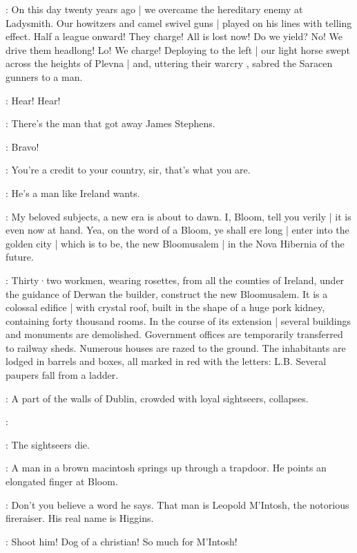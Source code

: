 \Bloom:
On this day twenty years ago |
we overcame the hereditary enemy at Ladysmith.
Our howitzers and camel swivel guns |
played on his lines with telling effect.
Half a league onward!
They charge!
All is lost now!
Do we yield?
No!
We drive them headlong!
Lo!
We charge!
Deploying to the left |
our light horse swept across the heights of Plevna |
and,
uttering their warcry ,
sabred the Saracen gunners to a man.

\Typesetters[1]:
Hear!
Hear!

\JohnWyse[2]:
There's the man that got away James Stephens.

\Bluecoat[1]:
Bravo!

\OldResident[2]:
You're a credit to your country,
sir,
that's what you are.

\AppleWoman[1]:
He's a man like Ireland wants.

\Bloom:
My beloved subjects,
a new era is about to dawn.
I,
Bloom,
tell you verily |
it is even now at hand.
Yea,
on the word of a Bloom,
ye shall ere long |
enter into the golden city |
which is to be,
the new Bloomusalem |
in the Nova Hibernia of the future.

:
Thirty·two workmen,
wearing rosettes,
from all the counties of Ireland,
under the guidance of Derwan the builder,
construct the new Bloomusalem.
It is a colossal edifice |
with crystal roof,
built in the shape of a huge pork kidney,
containing forty thousand rooms.
In the course of its extension |
several buildings and monuments are demolished.
Government offices are temporarily transferred to railway sheds.
Numerous houses are razed to the ground.
The inhabitants are lodged in barrels and boxes,
all marked in red with the letters:
L.B.
Several paupers fall from a ladder.

:
A part of the walls of Dublin,
crowded with loyal sightseers,
collapses.

\Sightseers:

\sout{}

:
The sightseers die.

:
A man in a brown macintosh springs up through a trapdoor.
He points an elongated finger at Bloom.

\Macintosh:
Don't you believe a word he says.
That man is Leopold M'Intosh,
the notorious fireraiser.
His real name is Higgins.

\Bloom:
Shoot him!
Dog of a christian!
So much for M'Intosh!

